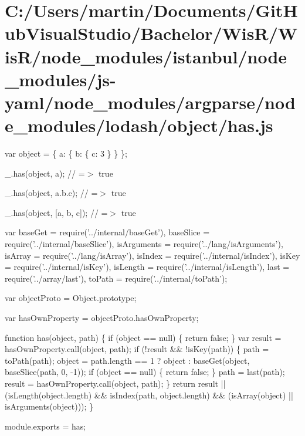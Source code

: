 \hypertarget{_c_1_2_users_2martin_2_documents_2_git_hub_visual_studio_2_bachelor_2_wis_r_2_wis_r_2node_module083339dec4b03ba327d0bc0b562b0f4d}{}\section{C\+:/\+Users/martin/\+Documents/\+Git\+Hub\+Visual\+Studio/\+Bachelor/\+Wis\+R/\+Wis\+R/node\+\_\+modules/istanbul/node\+\_\+modules/js-\/yaml/node\+\_\+modules/argparse/node\+\_\+modules/lodash/object/has.\+js}
var object = \{ \textquotesingle{}a\textquotesingle{}\+: \{ \textquotesingle{}b\textquotesingle{}\+: \{ \textquotesingle{}c\textquotesingle{}\+: 3 \} \} \};

\+\_\+.\+has(object, \textquotesingle{}a\textquotesingle{}); // =$>$ true

\+\_\+.\+has(object, \textquotesingle{}a.\+b.\+c\textquotesingle{}); // =$>$ true

\+\_\+.\+has(object, \mbox{[}\textquotesingle{}a\textquotesingle{}, \textquotesingle{}b\textquotesingle{}, \textquotesingle{}c\textquotesingle{}\mbox{]}); // =$>$ true


\begin{DoxyCodeInclude}
var baseGet = require(\textcolor{stringliteral}{'../internal/baseGet'}),
    baseSlice = require(\textcolor{stringliteral}{'../internal/baseSlice'}),
    isArguments = require(\textcolor{stringliteral}{'../lang/isArguments'}),
    isArray = require(\textcolor{stringliteral}{'../lang/isArray'}),
    isIndex = require(\textcolor{stringliteral}{'../internal/isIndex'}),
    isKey = require(\textcolor{stringliteral}{'../internal/isKey'}),
    isLength = require(\textcolor{stringliteral}{'../internal/isLength'}),
    last = require(\textcolor{stringliteral}{'../array/last'}),
    toPath = require(\textcolor{stringliteral}{'../internal/toPath'});

var objectProto = Object.prototype;

var hasOwnProperty = objectProto.hasOwnProperty;

\textcolor{keyword}{function} has(\textcolor{keywordtype}{object}, path) \{
  \textcolor{keywordflow}{if} (\textcolor{keywordtype}{object} == null) \{
    \textcolor{keywordflow}{return} \textcolor{keyword}{false};
  \}
  var result = hasOwnProperty.call(\textcolor{keywordtype}{object}, path);
  \textcolor{keywordflow}{if} (!result && !isKey(path)) \{
    path = toPath(path);
    \textcolor{keywordtype}{object} = path.length == 1 ? \textcolor{keywordtype}{object} : baseGet(\textcolor{keywordtype}{object}, baseSlice(path, 0, -1));
    \textcolor{keywordflow}{if} (\textcolor{keywordtype}{object} == null) \{
      \textcolor{keywordflow}{return} \textcolor{keyword}{false};
    \}
    path = last(path);
    result = hasOwnProperty.call(\textcolor{keywordtype}{object}, path);
  \}
  \textcolor{keywordflow}{return} result || (isLength(\textcolor{keywordtype}{object}.length) && isIndex(path, \textcolor{keywordtype}{object}.length) &&
    (isArray(\textcolor{keywordtype}{object}) || isArguments(\textcolor{keywordtype}{object})));
\}

module.exports = has;
\end{DoxyCodeInclude}
 
